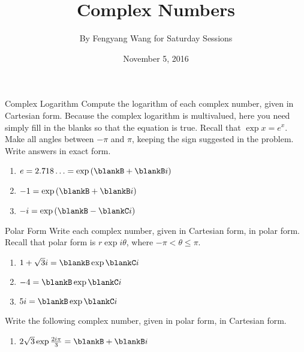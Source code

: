 \documentclass[12pt,letterpaper]{article}
\title{Complex Numbers}
\author{By Fengyang Wang for Saturday Sessions}
\date{November 5, 2016}
\newcommand{\im}{i}
\begin{document}
\HomeworkTitle

\begin{problem}{Complex Logarithm}
 Compute the logarithm of each complex number, given in Cartesian form. Because
 the complex logarithm is multivalued, here you need simply fill in the blanks
 so that the equation is true. Recall that \(\exp{x} = e^x\). Make all angles
 between \(-\pi\) and \(\pi\), keeping the sign suggested in the problem. Write
 answers in exact form.

 \begin{enumerate}[\hspace{.5cm}a.]
  \item \(e = 2.718\ldots = \exp\left(\blankB + \blankB\im\right)\)
  \item \(-1 = \exp\left(\blankB + \blankB\im\right)\)
  \item \(-\im = \exp\left(\blankB - \blankC\im\right)\)
 \end{enumerate}
\end{problem}

\begin{problem}{Polar Form}
 Write each complex number, given in Cartesian form, in polar form. Recall
 that polar form is \(r\exp{\im\theta}\), where \(-\pi < \theta \le \pi\).

 \begin{enumerate}[\hspace{.5cm}a.]
  \item \(1 + \sqrt{3}\im = \blankB\exp\blankC\im\)
  \item \(-4 = \blankB\exp\blankC\im\)
  \item \(5\im = \blankB\exp\blankC\im\)
 \end{enumerate}

 \noindent Write the following complex number, given in polar form, in
 Cartesian form.

 \begin{enumerate}[\hspace{.5cm}a.]
  \item \(2\sqrt{3}\exp\frac{2\im\pi}{3} = \blankB + \blankB\im\)
 \end{enumerate}
\end{problem}
\end{document}
